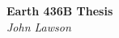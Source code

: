 \newpage
   \begin{center}
      \Large\textbf{Earth 436B Thesis}\\
      \large\textit{John Lawson}
   \end{center}

\newpage
